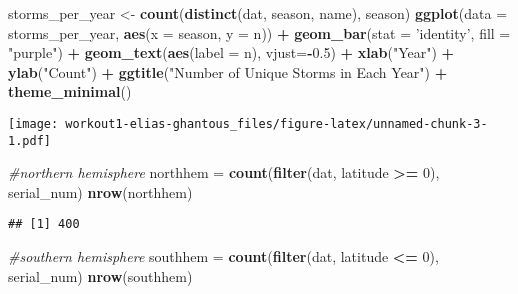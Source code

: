 \documentclass[]{article}
\newenvironment{Shaded}{\begin{snugshade}}{\end{snugshade}}
\newcommand{\KeywordTok}[1]{\textcolor[rgb]{0.13,0.29,0.53}{\textbf{#1}}}
\newcommand{\DataTypeTok}[1]{\textcolor[rgb]{0.13,0.29,0.53}{#1}}
\newcommand{\DecValTok}[1]{\textcolor[rgb]{0.00,0.00,0.81}{#1}}
\newcommand{\FloatTok}[1]{\textcolor[rgb]{0.00,0.00,0.81}{#1}}
\newcommand{\StringTok}[1]{\textcolor[rgb]{0.31,0.60,0.02}{#1}}
\newcommand{\CommentTok}[1]{\textcolor[rgb]{0.56,0.35,0.01}{\textit{#1}}}
\newcommand{\OperatorTok}[1]{\textcolor[rgb]{0.81,0.36,0.00}{\textbf{#1}}}
\newcommand{\NormalTok}[1]{#1}
\begin{document}
\begin{Shaded}
\begin{Highlighting}[]
\NormalTok{storms_per_year <-}\StringTok{ }\KeywordTok{count}\NormalTok{(}\KeywordTok{distinct}\NormalTok{(dat, season, name), season)}
\KeywordTok{ggplot}\NormalTok{(}\DataTypeTok{data =}\NormalTok{ storms_per_year, }\KeywordTok{aes}\NormalTok{(}\DataTypeTok{x =}\NormalTok{ season, }\DataTypeTok{y =}\NormalTok{ n)) }\OperatorTok{+}\StringTok{ }\KeywordTok{geom_bar}\NormalTok{(}\DataTypeTok{stat =} \StringTok{'identity'}\NormalTok{, }\DataTypeTok{fill =} \StringTok{"purple"}\NormalTok{) }\OperatorTok{+}\StringTok{ }\KeywordTok{geom_text}\NormalTok{(}\KeywordTok{aes}\NormalTok{(}\DataTypeTok{label =}\NormalTok{ n), }\DataTypeTok{vjust=}\OperatorTok{-}\FloatTok{0.5}\NormalTok{) }\OperatorTok{+}
\StringTok{  }\KeywordTok{xlab}\NormalTok{(}\StringTok{"Year"}\NormalTok{) }\OperatorTok{+}\StringTok{ }\KeywordTok{ylab}\NormalTok{(}\StringTok{"Count"}\NormalTok{) }\OperatorTok{+}\StringTok{ }\KeywordTok{ggtitle}\NormalTok{(}\StringTok{"Number of Unique Storms in Each Year"}\NormalTok{) }\OperatorTok{+}\StringTok{ }\KeywordTok{theme_minimal}\NormalTok{()}
\end{Highlighting}
\end{Shaded}

\texttt{[image: workout1-elias-ghantous\_files/figure-latex/unnamed-chunk-3-1.pdf]}

\begin{Shaded}
\begin{Highlighting}[]
\CommentTok{#northern hemisphere}
\NormalTok{northhem =}\StringTok{ }\KeywordTok{count}\NormalTok{(}\KeywordTok{filter}\NormalTok{(dat, latitude }\OperatorTok{>=}\StringTok{ }\DecValTok{0}\NormalTok{), serial_num)}
\KeywordTok{nrow}\NormalTok{(northhem)}
\end{Highlighting}
\end{Shaded}

\begin{verbatim}
## [1] 400
\end{verbatim}

\begin{Shaded}
\begin{Highlighting}[]
\CommentTok{#southern hemisphere}
\NormalTok{southhem =}\StringTok{ }\KeywordTok{count}\NormalTok{(}\KeywordTok{filter}\NormalTok{(dat, latitude }\OperatorTok{<=}\StringTok{ }\DecValTok{0}\NormalTok{), serial_num)}
\KeywordTok{nrow}\NormalTok{(southhem)}
\end{Highlighting}
\end{Shaded}
\end{document}
